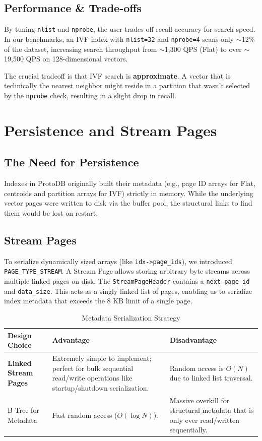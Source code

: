 \documentclass[12pt, a4paper]{report}
\begin{document}
\section{Performance \& Trade-offs}
By tuning \texttt{nlist} and \texttt{nprobe}, the user trades off recall accuracy for search speed. In our benchmarks, an IVF index with \texttt{nlist=32} and \texttt{nprobe=4} scans only $\sim$12\% of the dataset, increasing search throughput from $\sim$1,300 QPS (Flat) to over $\sim$19,500 QPS on 128-dimensional vectors.

The crucial tradeoff is that IVF search is \textbf{approximate}. A vector that is technically the nearest neighbor might reside in a partition that wasn't selected by the \texttt{nprobe} check, resulting in a slight drop in recall.


\chapter{Persistence and Stream Pages}

\section{The Need for Persistence}
Indexes in ProtoDB originally built their metadata (e.g., page ID arrays for Flat, centroids and partition arrays for IVF) strictly in memory. While the underlying vector pages were written to disk via the buffer pool, the structural links to find them would be lost on restart.

\section{Stream Pages}
To serialize dynamically sized arrays (like \texttt{idx->page\_ids}), we introduced \texttt{PAGE\_TYPE\_STREAM}.
A Stream Page allows storing arbitrary byte streams across multiple linked pages on disk.
The \texttt{StreamPageHeader} contains a \texttt{next\_page\_id} and \texttt{data\_size}.
This acts as a singly linked list of pages, enabling us to serialize index metadata that exceeds the 8 KB limit of a single page.

\begin{table}[h]
\centering
\begin{tabularx}{\textwidth}{lXX}
\toprule
\textbf{Design Choice} & \textbf{Advantage} & \textbf{Disadvantage} \\
\midrule
\textbf{Linked Stream Pages} &
    Extremely simple to implement; perfect for bulk sequential read/write operations like startup/shutdown serialization. &
    Random access is $O(N)$ due to linked list traversal. \\
\addlinespace
B-Tree for Metadata &
    Fast random access ($O(\log N)$). &
    Massive overkill for structural metadata that is only ever read/written sequentially. \\
\bottomrule
\end{tabularx}
\caption{Metadata Serialization Strategy}
\end{table}
\end{document}
